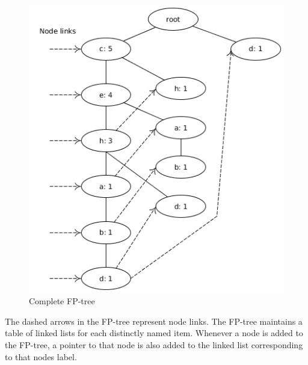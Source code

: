\begin{figure}[hbn]
	\centering
	\includegraphics[scale=0.5]{fp-tree-example/fp-tree-p3.png}
	\caption{Complete FP-tree}
	\label{figure:fp-growth-example3}
\end{figure}

The dashed arrows in the FP-tree represent node links. The FP-tree maintains a table of linked lists for each distinctly named item. Whenever a node is added to the FP-tree, a pointer to that node is also added to the linked list corresponding to that nodes label. 